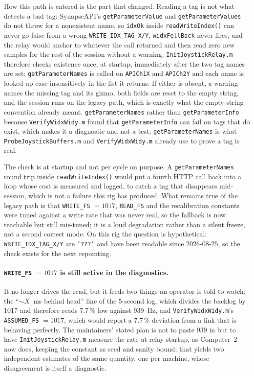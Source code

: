 \documentclass[11pt,a4paper]{article}
\newcommand{\code}[1]{\texttt{\small #1}}
\newcommand{\file}[1]{\texttt{\small #1}}
\begin{document}
How this path is entered is the part that changed. Reading a tag is not what
detects a bad tag: SynapseAPI's \code{getParameterValue} and
\code{getParameterValues} do not throw for a nonexistent name, so \code{idxOk}
inside \code{readWriteIndex()} can never go false from a wrong
\code{WRITE\_IDX\_TAG\_X/Y}, \code{widxFellBack} never fires, and the relay
would anchor to whatever the call returned and then read zero new samples for
the rest of the session without a warning. \file{InitJoystickRelay.m} therefore
checks existence once, at startup, immediately after the two tag names are set:
\code{getParameterNames} is called on \code{APICh1X} and \code{APICh2Y} and each
name is looked up case-insensitively in the list it returns. If either is
absent, a warning names the missing tag and its gizmo, both fields are reset to
the empty string, and the session runs on the legacy path, which is exactly what
the empty-string convention already meant. \code{getParameterNames} rather than
\code{getParameterInfo} because \file{VerifyWidxWidy.m} found that
\code{getParameterInfo} can fail on tags that do exist, which makes it a
diagnostic and not a test; \code{getParameterNames} is what
\file{ProbeJoystickBuffers.m} and \file{VerifyWidxWidy.m} already use to prove a
tag is real.

The check is at startup and not per cycle on purpose. A
\code{getParameterNames} round trip inside \code{readWriteIndex()} would put a
fourth HTTP call back into a loop whose cost is measured and logged, to catch a
tag that disappears mid-session, which is not a failure this rig has produced.
What remains true of the legacy path is that \code{WRITE\_FS} $= 1017$,
\code{READ\_FS} and the recalibration constants were tuned against a write rate
that was never real, so the fallback is now reachable but still mis-tuned; it is
a loud degradation rather than a silent freeze, not a second correct mode. On
this rig the question is hypothetical: \code{WRITE\_IDX\_TAG\_X/Y} are
\code{'???'} and have been readable since 2026-08-25, so the check exists for
the next repointing.

\paragraph{\code{WRITE\_FS} $= 1017$ is still active in the diagnostics.} It no
longer drives the read, but it feeds two things an operator is told to watch:
the ``$\sim X$~ms behind head'' line of the 5-second log, which divides the
backlog by 1017 and therefore reads 7.7\,\% low against 939~Hz, and
\file{VerifyWidxWidy.m}'s \code{ASSUMED\_FS} $= 1017$, which would report a
7.7\,\% deviation from a link that is behaving perfectly. The maintainers'
stated plan is not to paste 939 in but to have \file{InitJoystickRelay.m}
measure the rate at relay startup, as Computer~2 now does, keeping the constant
as seed and sanity bound; that yields two independent estimates of the same
quantity, one per machine, whose disagreement is itself a diagnostic.
\end{document}
